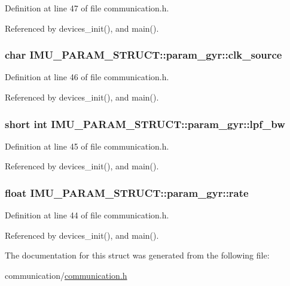 Definition at line 47 of file communication.h.



Referenced by devices\_\-init(), and main().

\hypertarget{structIMU__PARAM__STRUCT_1_1param__gyr_aca3b791cb480f2da4703d4c256a7de48}{
\subsubsection[{clk\_\-source}]{\setlength{\rightskip}{0pt plus 5cm}char {\bf IMU\_\-PARAM\_\-STRUCT::param\_\-gyr::clk\_\-source}}}
\label{structIMU__PARAM__STRUCT_1_1param__gyr_aca3b791cb480f2da4703d4c256a7de48}


Definition at line 46 of file communication.h.



Referenced by devices\_\-init(), and main().

\hypertarget{structIMU__PARAM__STRUCT_1_1param__gyr_aa612f7299b43a1bf1fc597688c2fa02d}{
\subsubsection[{lpf\_\-bw}]{\setlength{\rightskip}{0pt plus 5cm}short int {\bf IMU\_\-PARAM\_\-STRUCT::param\_\-gyr::lpf\_\-bw}}}
\label{structIMU__PARAM__STRUCT_1_1param__gyr_aa612f7299b43a1bf1fc597688c2fa02d}


Definition at line 45 of file communication.h.



Referenced by devices\_\-init(), and main().

\hypertarget{structIMU__PARAM__STRUCT_1_1param__gyr_a5aa70e1e9634411c89aacfbc570cc91c}{
\subsubsection[{rate}]{\setlength{\rightskip}{0pt plus 5cm}float {\bf IMU\_\-PARAM\_\-STRUCT::param\_\-gyr::rate}}}
\label{structIMU__PARAM__STRUCT_1_1param__gyr_a5aa70e1e9634411c89aacfbc570cc91c}


Definition at line 44 of file communication.h.



Referenced by devices\_\-init(), and main().



The documentation for this struct was generated from the following file:\begin{DoxyCompactItemize}
\item 
communication/\hyperlink{communication_8h}{communication.h}\end{DoxyCompactItemize}
